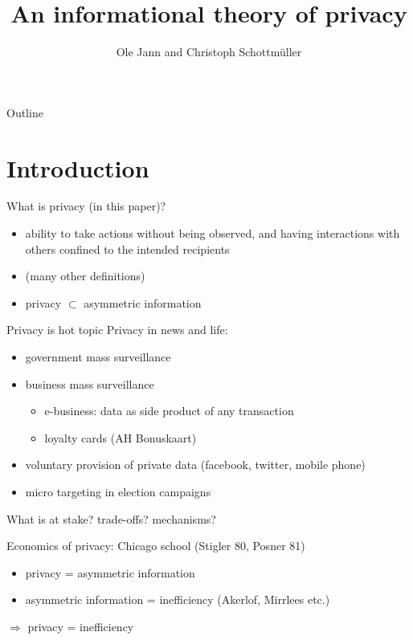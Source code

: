\documentclass[bigger]{beamer}
\author{Ole Jann and Christoph Schottmüller}
\date{}
\title{An informational theory of privacy}
\begin{document}
\maketitle
\begin{frame}{Outline}
\tableofcontents
\end{frame}


\section{Introduction}
\label{sec:orgheadline6}

\begin{frame}[label={sec:orgheadline1}]{What is privacy (in this paper)?}
\begin{itemize}
\item ability to take actions without being observed, and having interactions with others confined to the intended recipients
\item (many other definitions)
\item privacy \(\subset\) asymmetric information
\end{itemize}
\end{frame}

\begin{frame}[label={sec:orgheadline2}]{Privacy is hot topic}
Privacy in news and life: 
\begin{itemize}
\item government mass surveillance
\item business mass surveillance
\begin{itemize}
\item e-business: data as side product of any transaction
\item loyalty cards (AH Bonuskaart)
\end{itemize}
\item voluntary provision of private data (facebook, twitter, mobile phone)
\item micro targeting in election campaigns
\end{itemize}

What is at stake? trade-offs? mechanisms?
\end{frame}




\begin{frame}[label={sec:orgheadline3}]{Economics of privacy: Chicago school (Stigler 80, Posner 81)}
\begin{itemize}
\item privacy = asymmetric information
\item asymmetric information = inefficiency (Akerlof, Mirrlees etc.)
\end{itemize}

\(\Rightarrow\) privacy = inefficiency 
\end{frame}
\end{document}
